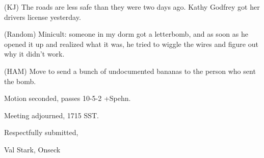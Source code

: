 \documentclass[12pt]{article}
\begin{document}
(KJ) The roads are less safe than they were two days ago. Kathy Godfrey got her drivers license yesterday.

(Random) Minicult: someone in my dorm got a letterbomb, and as soon as he opened it up and realized what it was, he tried to wiggle the wires and figure out why it didn't work. 

(HAM) Move to send a bunch of undocumented bananas to the person who sent the bomb.

Motion seconded, passes 10-5-2 +Spehn.

\vspace{12pt}

\noindent
Meeting adjourned, 1715 SST.

\vspace{18pt}

\centerline{Respectfully submitted,}
\centerline{Val Stark, Onseck}
\end{document}
